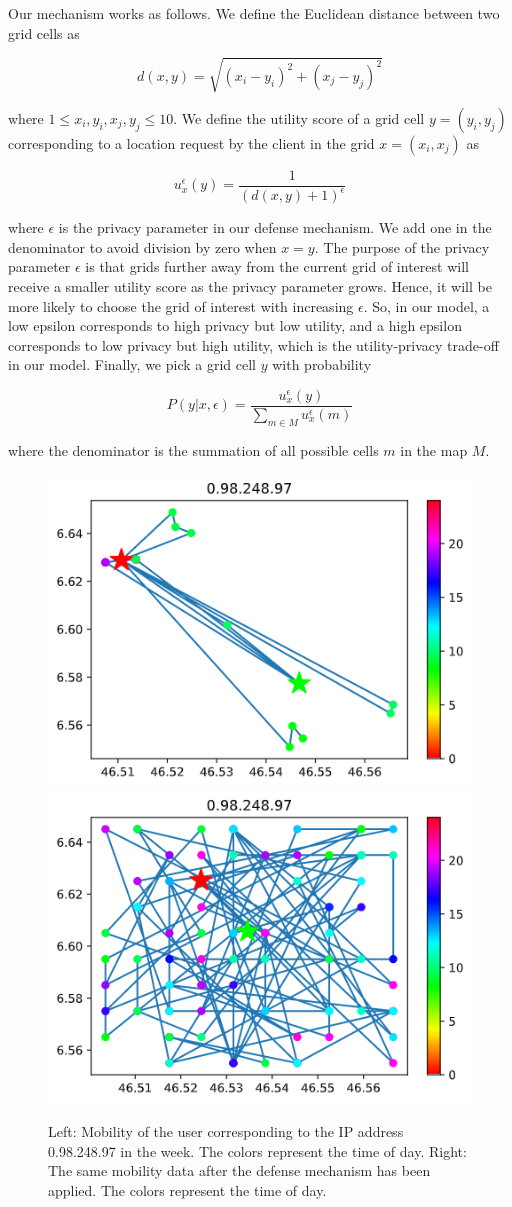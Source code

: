 \documentclass[9pt,conference]{IEEEtran}
\begin{document}
Our mechanism works as follows. We define the Euclidean distance between two grid cells as

$$d(x,y) = \sqrt{(x_i-y_i)^2 + (x_j-y_j)^2}$$

where $1 \leq x_i,y_i,x_j,y_j \leq 10$. We define the utility score of a grid cell $y=(y_i,y_j)$ corresponding to a location request by the client in the grid $x=(x_i,x_j)$ as

$$u_x^{\epsilon}(y)=\frac{1}{(d(x,y)+1)^\epsilon}$$

where $\epsilon$ is the privacy parameter in our defense mechanism. We add one in the denominator to avoid division by zero when $x=y$. The purpose of the privacy parameter $\epsilon$ is that grids further away from the current grid of interest will receive a smaller utility score as the privacy parameter grows. Hence, it will be more likely to choose the grid of interest with increasing $\epsilon$. So, in our model, a low epsilon corresponds to high privacy but low utility, and a high epsilon corresponds to low privacy but high utility, which is the utility-privacy trade-off in our model. Finally, we pick a grid cell $y$ with probability

$$P(y|x,\epsilon) = \frac{u_x^{\epsilon}(y)}{\sum_{m \in M} u_x^{\epsilon}(m)}$$

where the denominator is the summation of all possible cells $m$ in the map $M$.

\begin{figure}
    \centering
    \includegraphics[width=0.45\linewidth]{images/0.98.248.87_insecure.png}
    \includegraphics[width=0.45\linewidth]{images/0.98.248.87_secure.png}
    \caption{Left: Mobility of the user corresponding to the IP address 0.98.248.97 in the week. The colors represent the time of day. Right: The same mobility data after the defense mechanism has been applied. The colors represent the time of day.}
    \label{fig:insecure}
\end{figure}
\end{document}
